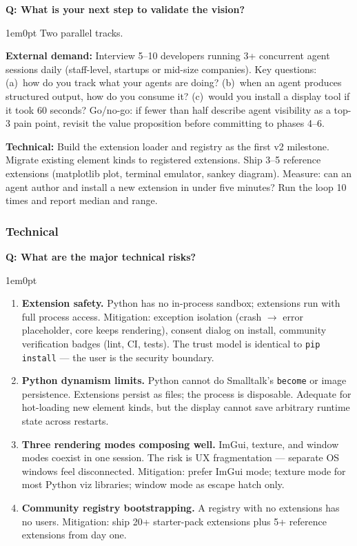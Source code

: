 \documentclass[11pt,letterpaper]{article}
\newcounter{faqnum}
\newenvironment{faqpair}[1]{%
  \needspace{4\baselineskip}%
  \vspace{0.5em}%
  \refstepcounter{faqnum}%
  \noindent\textbf{\color{SectionBlue}Q\thefaqnum: #1}\par\nopagebreak[4]%
  \vspace{0.2em}%
  \begin{adjustwidth}{1em}{0pt}%
  \setlength{\parindent}{0pt}%
}{%
  \end{adjustwidth}%
  \vspace{0.5em}%
}
\begin{document}
\begin{faqpair}{What is your next step to validate the vision?}\label{faq:next-step}
  Two parallel tracks.

  \textbf{External demand:} Interview 5--10 developers running 3+
  concurrent agent sessions daily (staff-level, startups or mid-size
  companies).  Key questions: (a)~how do you track what your agents are
  doing? (b)~when an agent produces structured output, how do you consume
  it? (c)~would you install a display tool if it took 60 seconds?
  Go/no-go: if fewer than half describe agent visibility as a top-3 pain
  point, revisit the value proposition before committing to phases 4--6.

  \textbf{Technical:} Build the extension loader and registry as the first
  v2 milestone.  Migrate existing element kinds to registered extensions.
  Ship 3--5 reference extensions (matplotlib plot, terminal emulator,
  sankey diagram).  Measure: can an agent author and install a new
  extension in under five minutes?  Run the loop 10 times and report
  median and range.
\end{faqpair}

\subsubsection*{Technical}

\begin{faqpair}{What are the major technical risks?}\label{faq:tech-risks}
  \begin{enumerate}[nosep]
    \item \textbf{Extension safety.}  Python has no in-process sandbox;
      extensions run with full process access.  Mitigation: exception
      isolation (crash $\to$ error placeholder, core keeps rendering),
      consent dialog on install, community verification badges (lint, CI,
      tests).  The trust model is identical to \texttt{pip install} ---
      the user is the security boundary.
    \item \textbf{Python dynamism limits.}  Python cannot do Smalltalk's
      \texttt{become} or image persistence.  Extensions persist as files;
      the process is disposable.  Adequate for hot-loading new element
      kinds, but the display cannot save arbitrary runtime state across
      restarts.
    \item \textbf{Three rendering modes composing well.}  ImGui, texture,
      and window modes coexist in one session.  The risk is UX
      fragmentation --- separate OS windows feel disconnected.  Mitigation:
      prefer ImGui mode; texture mode for most Python viz libraries;
      window mode as escape hatch only.
    \item \textbf{Community registry bootstrapping.}  A registry with no
      extensions has no users.  Mitigation: ship 20+ starter-pack
      extensions plus 5+ reference extensions from day one.
  \end{enumerate}
\end{faqpair}
\end{document}
